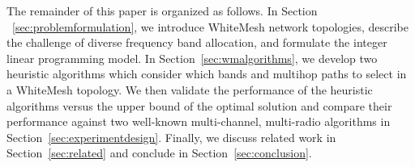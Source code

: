 The remainder of this paper is organized as follows. In Section ~\ref{sec:problemformulation}, 
we introduce WhiteMesh network topologies, describe the challenge of 
diverse frequency band allocation, and formulate the integer linear
programming model. In Section~\ref{sec:wmalgorithms}, we develop two heuristic algorithms which consider which bands 
and multihop paths to select in a WhiteMesh topology.  We then validate the performance of the heuristic algorithms 
versus the upper bound of the optimal solution and compare their performance against two well-known multi-channel, 
multi-radio algorithms in Section~\ref{sec:experimentdesign}. Finally, we discuss related work in Section~\ref{sec:related} 
and conclude in Section~\ref{sec:conclusion}.


